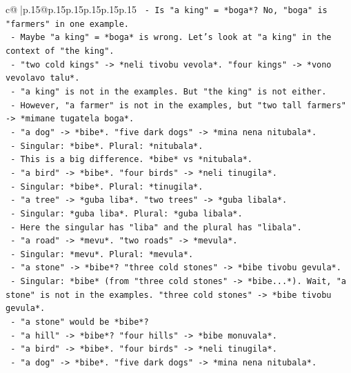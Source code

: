 \documentclass{article}
\begin{document}
{\begin{supertabular}{c@{$\;$}|p{.15\linewidth}@{}p{.15\linewidth}p{.15\linewidth}p{.15\linewidth}p{.15\linewidth}p{.15\linewidth}}
{{{\texttt{        {-} Is "a king" = *boga*? No, "boga" is "farmers" in one example.} \\
\texttt{        {-} Maybe "a king" = *boga* is wrong. Let's look at "a king" in the context of "the king".} \\
\texttt{        {-} "two cold kings" {-}> *neli tivobu vevola*. "four kings" {-}> *vono vevolavo talu*.} \\
\texttt{        {-} "a king" is not in the examples. But "the king" is not either.} \\
\texttt{        {-} However, "a farmer" is not in the examples, but "two tall farmers" {-}> *mimane tugatela boga*.} \\
\texttt{        {-} "a dog" {-}> *bibe*. "five dark dogs" {-}> *mina nena nitubala*.} \\
\texttt{          {-} Singular: *bibe*. Plural: *nitubala*.} \\
\texttt{          {-} This is a big difference. *bibe* vs *nitubala*.} \\
\texttt{          {-} "a bird" {-}> *bibe*. "four birds" {-}> *neli tinugila*.} \\
\texttt{            {-} Singular: *bibe*. Plural: *tinugila*.} \\
\texttt{          {-} "a tree" {-}> *guba liba*. "two trees" {-}> *guba libala*.} \\
\texttt{            {-} Singular: *guba liba*. Plural: *guba libala*.} \\
\texttt{            {-} Here the singular has "liba" and the plural has "libala".} \\
\texttt{          {-} "a road" {-}> *mevu*. "two roads" {-}> *mevula*.} \\
\texttt{            {-} Singular: *mevu*. Plural: *mevula*.} \\
\texttt{          {-} "a stone" {-}> *bibe*? "three cold stones" {-}> *bibe tivobu gevula*.} \\
\texttt{            {-} Singular: *bibe* (from "three cold stones" {-}> *bibe...*). Wait, "a stone" is not in the examples. "three cold stones" {-}> *bibe tivobu gevula*.} \\
\texttt{            {-} "a stone" would be *bibe*?} \\
\texttt{            {-} "a hill" {-}> *bibe*? "four hills" {-}> *bibe monuvala*.} \\
\texttt{            {-} "a bird" {-}> *bibe*. "four birds" {-}> *neli tinugila*.} \\
\texttt{            {-} "a dog" {-}> *bibe*. "five dark dogs" {-}> *mina nena nitubala*.} \\
}}}
\end{supertabular}}
\end{document}
